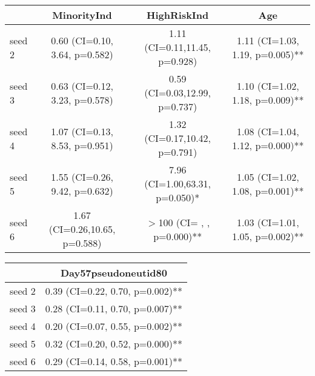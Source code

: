 \vspace{20pt}

\begin{tabular}{lccc}
   \hline  &MinorityInd& HighRiskInd& Age\\ 
\hline
seed 2 & 0.60 (CI=0.10, 3.64, p=0.582) & 1.11 (CI=0.11,11.45, p=0.928) & 1.11 (CI=1.03, 1.19, p=0.005)** \\ 
  seed 3 & 0.63 (CI=0.12, 3.23, p=0.578) & 0.59 (CI=0.03,12.99, p=0.737) & 1.10 (CI=1.02, 1.18, p=0.009)** \\ 
  seed 4 & 1.07 (CI=0.13, 8.53, p=0.951) & 1.32 (CI=0.17,10.42, p=0.791) & 1.08 (CI=1.04, 1.12, p=0.000)** \\ 
  seed 5 & 1.55 (CI=0.26, 9.42, p=0.632) & 7.96 (CI=1.00,63.31, p=0.050)* & 1.05 (CI=1.02, 1.08, p=0.001)** \\ 
  seed 6 & 1.67 (CI=0.26,10.65, p=0.588) & $>$100 (CI=  ,   , p=0.000)** & 1.03 (CI=1.01, 1.05, p=0.002)** \\ 
   \hline
\end{tabular}
\vspace{20pt}

\begin{tabular}{lc}
   \hline  &Day57pseudoneutid80\\ 
\hline
seed 2 & 0.39 (CI=0.22, 0.70, p=0.002)** \\ 
  seed 3 & 0.28 (CI=0.11, 0.70, p=0.007)** \\ 
  seed 4 & 0.20 (CI=0.07, 0.55, p=0.002)** \\ 
  seed 5 & 0.32 (CI=0.20, 0.52, p=0.000)** \\ 
  seed 6 & 0.29 (CI=0.14, 0.58, p=0.001)** \\ 
   \hline
\end{tabular}
